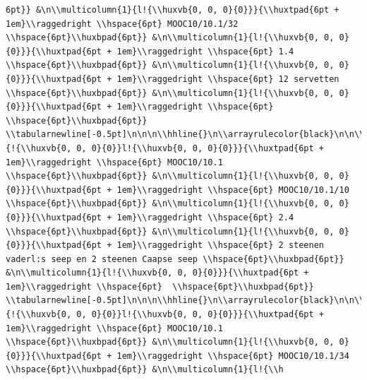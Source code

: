 \documentclass[11pt,preprint, authoryear]{elsarticle}
\numberwithin{equation}{section}
\numberwithin{figure}{section}
\numberwithin{table}{section}
\begin{document}
\begin{verbatim}
6pt}} &\n\\multicolumn{1}{l!{\\huxvb{0, 0, 0}{0}}}{\\huxtpad{6pt + 1em}\\raggedright \\hspace{6pt} MOOC10/10.1/32 \\hspace{6pt}\\huxbpad{6pt}} &\n\\multicolumn{1}{l!{\\huxvb{0, 0, 0}{0}}}{\\huxtpad{6pt + 1em}\\raggedright \\hspace{6pt} 1.4 \\hspace{6pt}\\huxbpad{6pt}} &\n\\multicolumn{1}{l!{\\huxvb{0, 0, 0}{0}}}{\\huxtpad{6pt + 1em}\\raggedright \\hspace{6pt} 12 servetten \\hspace{6pt}\\huxbpad{6pt}} &\n\\multicolumn{1}{l!{\\huxvb{0, 0, 0}{0}}}{\\huxtpad{6pt + 1em}\\raggedright \\hspace{6pt}  \\hspace{6pt}\\huxbpad{6pt}} \\tabularnewline[-0.5pt]\n\n\n\\hhline{}\n\\arrayrulecolor{black}\n\n\\multicolumn{1}{!{\\huxvb{0, 0, 0}{0}}l!{\\huxvb{0, 0, 0}{0}}}{\\huxtpad{6pt + 1em}\\raggedright \\hspace{6pt} MOOC10/10.1 \\hspace{6pt}\\huxbpad{6pt}} &\n\\multicolumn{1}{l!{\\huxvb{0, 0, 0}{0}}}{\\huxtpad{6pt + 1em}\\raggedright \\hspace{6pt} MOOC10/10.1/10 \\hspace{6pt}\\huxbpad{6pt}} &\n\\multicolumn{1}{l!{\\huxvb{0, 0, 0}{0}}}{\\huxtpad{6pt + 1em}\\raggedright \\hspace{6pt} 2.4 \\hspace{6pt}\\huxbpad{6pt}} &\n\\multicolumn{1}{l!{\\huxvb{0, 0, 0}{0}}}{\\huxtpad{6pt + 1em}\\raggedright \\hspace{6pt} 2 steenen vaderl:s seep en 2 steenen Caapse seep \\hspace{6pt}\\huxbpad{6pt}} &\n\\multicolumn{1}{l!{\\huxvb{0, 0, 0}{0}}}{\\huxtpad{6pt + 1em}\\raggedright \\hspace{6pt}  \\hspace{6pt}\\huxbpad{6pt}} \\tabularnewline[-0.5pt]\n\n\n\\hhline{}\n\\arrayrulecolor{black}\n\n\\multicolumn{1}{!{\\huxvb{0, 0, 0}{0}}l!{\\huxvb{0, 0, 0}{0}}}{\\huxtpad{6pt + 1em}\\raggedright \\hspace{6pt} MOOC10/10.1 \\hspace{6pt}\\huxbpad{6pt}} &\n\\multicolumn{1}{l!{\\huxvb{0, 0, 0}{0}}}{\\huxtpad{6pt + 1em}\\raggedright \\hspace{6pt} MOOC10/10.1/34 \\hspace{6pt}\\huxbpad{6pt}} &\n\\multicolumn{1}{l!{\\h
\end{verbatim}
\end{document}
